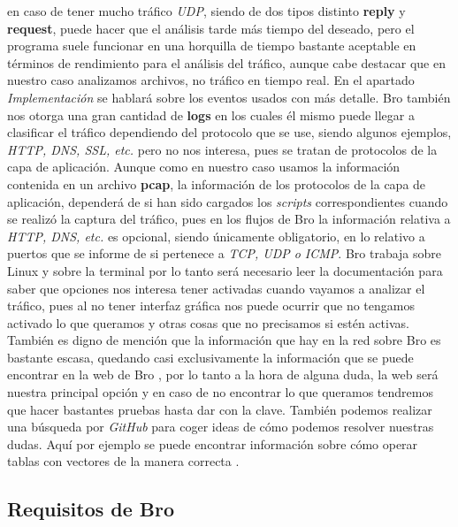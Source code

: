 en caso de tener mucho tráfico \textit{UDP}, siendo de dos tipos distinto \textbf{reply} y 
\textbf{request}, puede hacer que el análisis tarde más tiempo del deseado, pero 
el programa suele funcionar en una horquilla de tiempo bastante aceptable 
en términos de rendimiento para el análisis del tráfico, aunque cabe 
destacar que en nuestro caso analizamos archivos, no tráfico en tiempo real. 
En el apartado \textit{Implementación} se hablará sobre los eventos usados con más detalle.
\intro
Bro también nos otorga una gran cantidad de \textbf{logs} en los cuales él mismo puede 
llegar a clasificar el tráfico dependiendo del protocolo que se use, siendo 
algunos ejemplos, \textit{HTTP, DNS, SSL, etc.} pero no nos interesa, pues se tratan de protocolos 
de la capa de aplicación. Aunque como en nuestro caso usamos la información contenida en 
un archivo \textbf{pcap}, la información de los protocolos de la capa de aplicación, 
dependerá de si han sido cargados los \textit{scripts} correspondientes cuando se 
realizó la captura del tráfico, pues en los flujos 
de Bro la información relativa a \textit{HTTP, DNS, etc.} es opcional, siendo únicamente 
obligatorio, en lo relativo a puertos que se informe de si pertenece a \textit{TCP, UDP o ICMP}.
\intro
Bro trabaja sobre Linux y sobre la terminal por lo tanto será necesario leer 
la documentación para saber que opciones nos interesa tener activadas cuando 
vayamos a analizar el tráfico, pues al no tener interfaz gráfica nos puede 
ocurrir que no tengamos activado lo que queramos y otras cosas que no 
precisamos si estén activas.
\intro
También es digno de mención que la información que hay en la red sobre Bro 
es bastante escasa, quedando casi exclusivamente la información que se puede 
encontrar en la web de Bro \cite{broindex}, por lo tanto a la hora de alguna 
duda, la web será nuestra principal opción y en caso de no encontrar lo que 
queramos tendremos que hacer bastantes pruebas hasta dar con la clave. 
También podemos realizar una búsqueda por \textit{GitHub} para coger ideas de cómo 
podemos resolver nuestras dudas. Aquí por ejemplo se puede encontrar información 
sobre cómo operar tablas con vectores de la manera correcta \cite{gitbeacon}.

\subsection{Requisitos de Bro}


